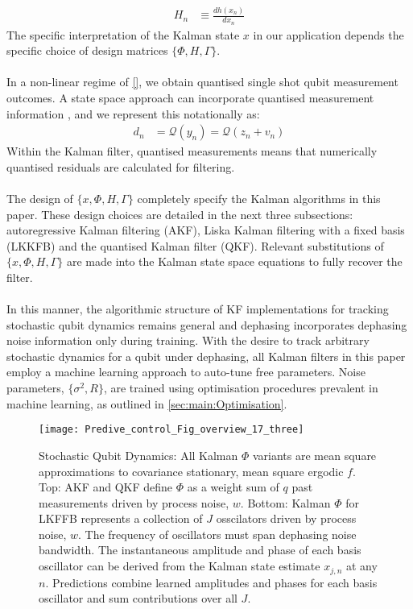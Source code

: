 \begin{align}
H_n &\equiv \frac{d h(x_n)}{dx_n}  
\end{align}
The specific interpretation of the Kalman state $x$ in our application depends the specific choice of design matrices $\{ \Phi, H, \Gamma\}$.
\\
\\
In a non-linear regime of \cref{}, we obtain quantised single shot qubit measurement outcomes. A state space approach can incorporate quantised measurement information \cite{karlsson2005}, and we represent this notationally as:
\begin{align}
d_n &= \mathcal{Q}(y_n) = \mathcal{Q}(z_n + v_n)
\end{align}
Within the Kalman filter, quantised measurements means that numerically quantised residuals are calculated for filtering.
\\
\\
The design of  $\{ x, \Phi, H, \Gamma \}$  completely specify the Kalman algorithms in this paper. These design choices are detailed in the next three subsections: autoregressive Kalman filtering (AKF), Liska Kalman filtering with a fixed basis (LKKFB) and the quantised Kalman filter (QKF). Relevant substitutions of $\{ x, \Phi, H, \Gamma \}$ are made into the Kalman state space equations to fully recover the filter. 
\\
\\
In this manner, the algorithmic structure of KF implementations for tracking stochastic qubit dynamics remains general and dephasing incorporates dephasing noise information only during training. With the desire to track arbitrary stochastic dynamics for a qubit under dephasing, all Kalman filters in this paper employ a machine learning approach to auto-tune free parameters. Noise parameters, $\{ \sigma^2, R \}$, are trained using optimisation procedures prevalent in machine learning, as outlined in \cref{sec:main:Optimisation}. 
\begin{figure} [h]
    \caption{\label{Predive_control_Fig_overview_17_three} Stochastic Qubit Dynamics: All Kalman $\Phi$ variants are mean square approximations to covariance stationary, mean square ergodic $f$. Top: AKF and QKF define $\Phi$ as a weight sum of $q$ past measurements driven by process noise, $w$. Bottom: Kalman $\Phi$ for LKFFB represents a collection of $J$ osscilators driven by process noise, $w$. The frequency of oscillators must span dephasing noise bandwidth. The instantaneous amplitude and phase of each basis oscillator can be derived from the Kalman state estimate $x_{j, n}$ at any $n$. Predictions combine learned amplitudes and phases for each basis oscillator and sum contributions over all $J$.}
    \texttt{[image: Predive\_control\_Fig\_overview\_17\_three]}
\end{figure}

